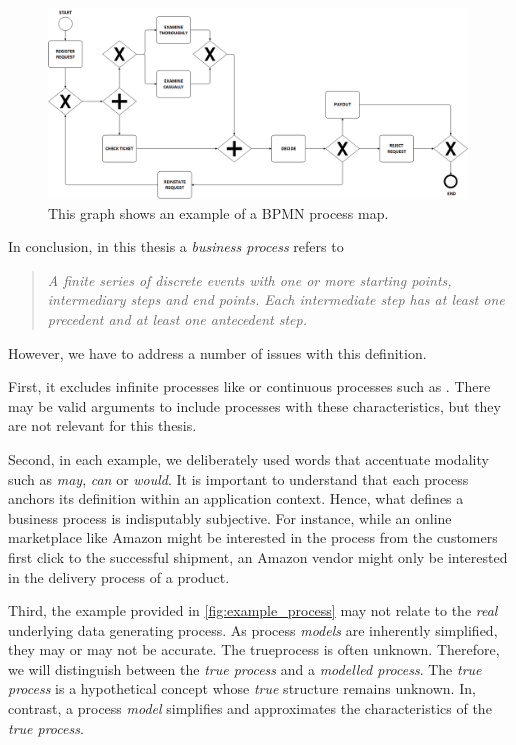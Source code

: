 \documentclass[./../../paper.tex]{subfiles}
\begin{document}
\begin{figure}[htb]
    \centering
    \includegraphics[width=0.99\textwidth]{figures/example_process.png}
    \caption{This graph shows an example of a \gls{BPMN} process map.}
    \label{fig:example_process}
\end{figure}



In conclusion, in this thesis a \emph{business process} refers to \begin{quote}
    \emph{A finite series of discrete events with one or more starting points, intermediary steps and end points. Each intermediate step has at least one precedent and at least one antecedent step.}
\end{quote}
However, we have to address a number of issues with this definition.

First, it excludes infinite processes like  or continuous processes such as . There may be valid arguments to include processes with these characteristics, but they are not relevant for this thesis.

Second, in each example, we deliberately used words that accentuate modality such as \emph{may}, \emph{can} or \emph{would}. It is important to understand that each process anchors its definition within an application context. Hence, what defines a business process is indisputably subjective. For instance, while an online marketplace like Amazon might be interested in the process from the customers first click to the successful shipment, an Amazon vendor might only be interested in the delivery process of a product.

Third, the example provided in \autoref{fig:example_process} may not relate to the \emph{real} underlying data generating process. As process \emph{models} are inherently simplified, they may or may not be accurate. The \gls{trueprocess} is often unknown. Therefore, we will distinguish between the \emph{true process} and a \emph{modelled process}. The \emph{true process} is a hypothetical concept whose \emph{true} structure remains unknown. In, contrast, a process \emph{model} simplifies and approximates the characteristics of the \emph{true process}.
\end{document}
